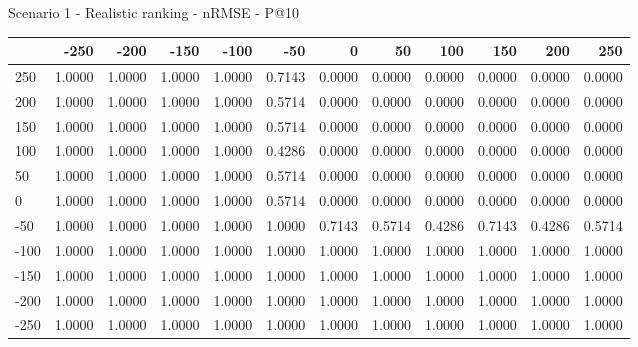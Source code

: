 Scenario 1 - Realistic ranking - nRMSE - P@10
\begin{tabular}{lrrrrrrrrrrr}
\toprule
{} &   -250 &   -200 &   -150 &   -100 &   -50  &    0   &    50  &    100 &    150 &    200 &    250 \\
\midrule
 250 & 1.0000 & 1.0000 & 1.0000 & 1.0000 & 0.7143 & 0.0000 & 0.0000 & 0.0000 & 0.0000 & 0.0000 & 0.0000 \\
 200 & 1.0000 & 1.0000 & 1.0000 & 1.0000 & 0.5714 & 0.0000 & 0.0000 & 0.0000 & 0.0000 & 0.0000 & 0.0000 \\
 150 & 1.0000 & 1.0000 & 1.0000 & 1.0000 & 0.5714 & 0.0000 & 0.0000 & 0.0000 & 0.0000 & 0.0000 & 0.0000 \\
 100 & 1.0000 & 1.0000 & 1.0000 & 1.0000 & 0.4286 & 0.0000 & 0.0000 & 0.0000 & 0.0000 & 0.0000 & 0.0000 \\
 50  & 1.0000 & 1.0000 & 1.0000 & 1.0000 & 0.5714 & 0.0000 & 0.0000 & 0.0000 & 0.0000 & 0.0000 & 0.0000 \\
 0   & 1.0000 & 1.0000 & 1.0000 & 1.0000 & 0.5714 & 0.0000 & 0.0000 & 0.0000 & 0.0000 & 0.0000 & 0.0000 \\
-50  & 1.0000 & 1.0000 & 1.0000 & 1.0000 & 1.0000 & 0.7143 & 0.5714 & 0.4286 & 0.7143 & 0.4286 & 0.5714 \\
-100 & 1.0000 & 1.0000 & 1.0000 & 1.0000 & 1.0000 & 1.0000 & 1.0000 & 1.0000 & 1.0000 & 1.0000 & 1.0000 \\
-150 & 1.0000 & 1.0000 & 1.0000 & 1.0000 & 1.0000 & 1.0000 & 1.0000 & 1.0000 & 1.0000 & 1.0000 & 1.0000 \\
-200 & 1.0000 & 1.0000 & 1.0000 & 1.0000 & 1.0000 & 1.0000 & 1.0000 & 1.0000 & 1.0000 & 1.0000 & 1.0000 \\
-250 & 1.0000 & 1.0000 & 1.0000 & 1.0000 & 1.0000 & 1.0000 & 1.0000 & 1.0000 & 1.0000 & 1.0000 & 1.0000 \\
\bottomrule
\end{tabular}

